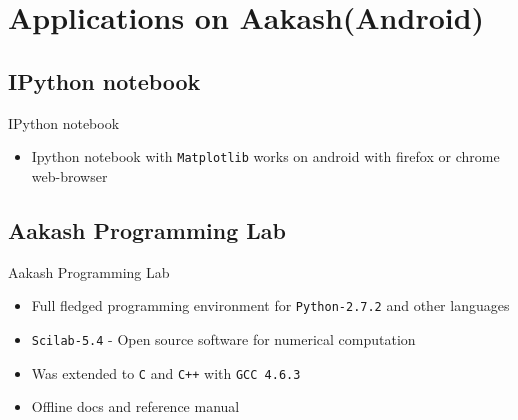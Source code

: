 \documentclass{beamer}
\begin{document}

\section{Applications on Aakash(Android)}
  \subsection{IPython notebook}
  \begin{frame}{IPython notebook}
    \begin{itemize}
      \item Ipython notebook with {\tt Matplotlib} works on android with
        firefox or chrome web-browser
        \pause
    \end{itemize}
    \begin{block}{}
    \end{block}
  \end{frame}

  \subsection{Aakash Programming Lab}
  \begin{frame}{Aakash Programming Lab}
    \begin{itemize}
      \item Full fledged programming environment for {\tt Python-2.7.2} and other
        languages
      \item {\tt Scilab-5.4} - Open source software for numerical computation
      \item Was extended to {\tt C} and {\tt C++} with {\tt GCC 4.6.3}
      \item Offline docs and reference manual
        \pause
    \end{itemize}
    \begin{block}{}
    \end{block}
  \end{frame}
\end{document}
